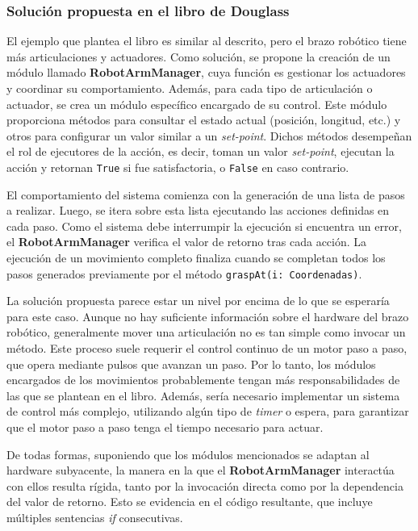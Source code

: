 \subsubsection*{Solución propuesta en el libro de Douglass}

El ejemplo que plantea el libro es similar al descrito, pero el brazo robótico tiene más articulaciones y actuadores. Como solución, se propone la creación de un módulo llamado \textbf{RobotArmManager}, cuya función es gestionar los actuadores y coordinar su comportamiento. Además, para cada tipo de articulación o actuador, se crea un módulo específico encargado de su control. Este módulo proporciona métodos para consultar el estado actual (posición, longitud, etc.) y otros para configurar un valor similar a un \textit{set-point}. Dichos métodos desempeñan el rol de ejecutores de la acción, es decir, toman un valor \textit{set-point}, ejecutan la acción y retornan \verb|True| si fue satisfactoria, o \verb|False| en caso contrario.

El comportamiento del sistema comienza con la generación de una lista de pasos a realizar. Luego, se itera sobre esta lista ejecutando las acciones definidas en cada paso. Como el sistema debe interrumpir la ejecución si encuentra un error, el \textbf{RobotArmManager} verifica el valor de retorno tras cada acción. La ejecución de un movimiento completo finaliza cuando se completan todos los pasos generados previamente por el método \verb|graspAt(i: Coordenadas)|.

La solución propuesta parece estar un nivel por encima de lo que se esperaría para este caso. Aunque no hay suficiente información sobre el hardware del brazo robótico, generalmente mover una articulación no es tan simple como invocar un método. Este proceso suele requerir el control continuo de un motor paso a paso, que opera mediante pulsos que avanzan un paso. Por lo tanto, los módulos encargados de los movimientos probablemente tengan más responsabilidades de las que se plantean en el libro. Además, sería necesario implementar un sistema de control más complejo, utilizando algún tipo de \textit{timer} o espera, para garantizar que el motor paso a paso tenga el tiempo necesario para actuar.

De todas formas, suponiendo que los módulos mencionados se adaptan al hardware subyacente, la manera en la que el \textbf{RobotArmManager} interactúa con ellos resulta rígida, tanto por la invocación directa como por la dependencia del valor de retorno. Esto se evidencia en el código resultante, que incluye múltiples sentencias \textit{if} consecutivas.

